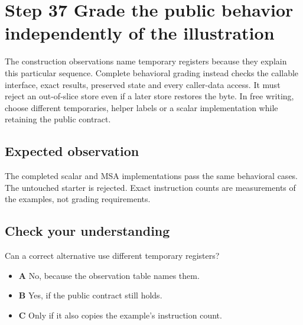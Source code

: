 \section{Step 37 Grade the public behavior independently of the illustration}\label{pcm-s37}

The construction observations name temporary registers because they explain this particular sequence. Complete behavioral grading instead checks the callable interface, exact results, preserved state and every caller-data access. It must reject an out-of-slice store even if a later store restores the byte. In free writing, choose different temporaries, helper labels or a scalar implementation while retaining the public contract.

\subsection{Expected observation}
The completed scalar and MSA implementations pass the same behavioral cases. The untouched starter is rejected. Exact instruction counts are measurements of the examples, not grading requirements.

\subsection{Check your understanding}
Can a correct alternative use different temporary registers?

\begin{itemize}
  \item \textbf{A} No, because the observation table names them.
  \item \textbf{B} Yes, if the public contract still holds.
  \item \textbf{C} Only if it also copies the example’s instruction count.
\end{itemize}
